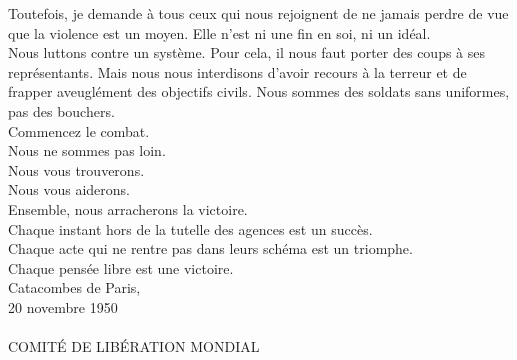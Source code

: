 \documentclass[11pt,twoside,a4paper]{article}
\begin{document}
\begin{multicols}{2}
Toutefois, je demande {\`a} tous ceux qui nous rejoignent de ne jamais perdre de vue que la violence est un moyen. Elle n'est ni une fin en soi, ni un id{\'e}al. ~\\ 

Nous luttons contre un syst{\`e}me. Pour cela, il nous faut porter des coups {\`a} ses repr{\'e}sentants. Mais nous nous interdisons d'avoir recours {\`a} la terreur et de frapper aveugl{\'e}ment des objectifs civils. Nous sommes des soldats sans uniformes, pas des bouchers. ~\\ 

Commencez le combat. ~\\
Nous ne sommes pas loin. ~\\
Nous vous trouverons. ~\\
Nous vous aiderons. ~\\
Ensemble, nous arracherons la victoire. ~\\

Chaque instant hors de la tutelle des agences est un succ{\`e}s. ~\\
Chaque acte qui ne rentre pas dans leurs sch{\'e}ma est un triomphe. ~\\
Chaque pens{\'e}e libre est une victoire. ~\\

Catacombes de Paris, ~\\
20 novembre 1950 ~\\~\\

{\large COMIT{\'E} DE LIB{\'E}RATION MONDIAL}~\\

\end{multicols} 
\end{document}
